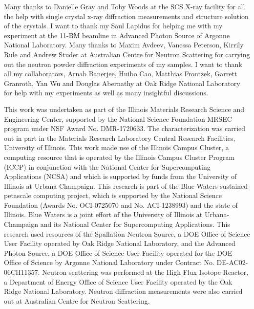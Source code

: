 \documentclass[10pt,doublespacing,edeposit]{uiucthesis2020}
\begin{document}
\begin{frontmatter}
Many thanks to Danielle Gray and Toby Woods at the SCS X-ray facility for all the help with single crystal x-ray diffraction measurements and structure solution of the crystals. I want to thank my Saul Lapidus for helping me with my experiment at the 11-BM beamline in Advanced Photon Source of Argonne National Laboratory. Many thanks to Maxim Avdeev, Vanessa Peterson, Kirrily Rule and Andrew Studer at Australian Centre for Neutron Scattering for carrying out the neutron powder diffraction experiments of my samples. I want to thank all my collaborators, Arnab Banerjee, Huibo Cao, Matthias Frontzek, Garrett Granroth, Yan Wu and Douglas Abernathy at Oak Ridge National Laboratory for help with my experiments as well as many insightful discussions.

This work was undertaken as part of the Illinois Materials Research Science and Engineering Center, supported by the National Science Foundation MRSEC program under NSF Award No. DMR-1720633. The characterization was carried out in part in the Materials Research Laboratory Central Research Facilities, University of Illinois. This work made use of the Illinois Campus Cluster, a computing resource that is operated by the Illinois Campus Cluster Program (ICCP) in conjunction with the National Center for Supercomputing Applications (NCSA) and which is supported by funds from the University of Illinois at Urbana-Champaign. This research is part of the Blue Waters sustained-petascale computing project, which is supported by the National Science Foundation (Awards No. OCI-0725070 and No. ACI-1238993) and the state of Illinois. Blue Waters is a joint effort of the University of Illinois at Urbana-Champaign and its National Center for Supercomputing Applications. This research used resources of the Spallation Neutron Source, a DOE Office of Science User Facility operated by Oak Ridge National Laboratory, and the Advanced Photon Source, a DOE Office of Science User Facility operated for the DOE Office of Science by Argonne National Laboratory under Contract No. DE-AC02-06CH11357. Neutron scattering was performed at the High Flux Isotope Reactor, a Department of Energy Office of Science User Facility operated by the Oak Ridge National Laboratory. Neutron diffraction measurements were also carried out at Australian Centre for Neutron Scattering.



\tableofcontents
\listoftables
\listoffigures

\end{frontmatter}
\end{document}
